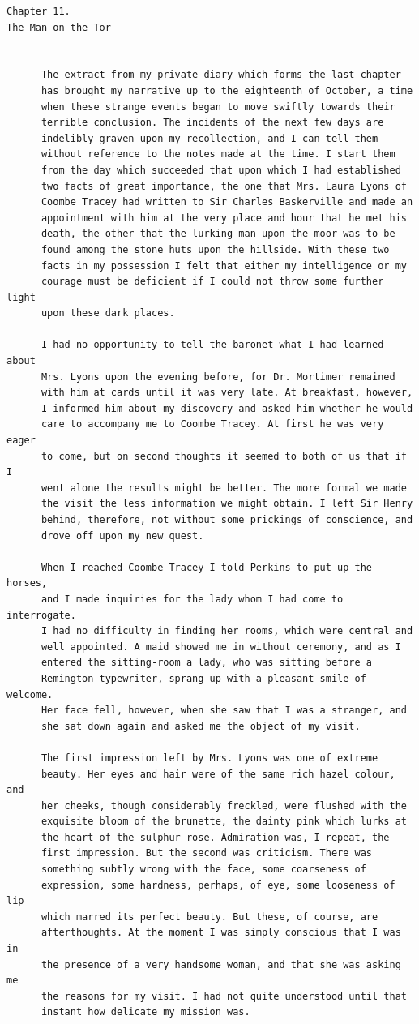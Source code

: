 \documentclass{article}
\begin{document}
\begin{verbatim}
Chapter 11.
The Man on the Tor


      The extract from my private diary which forms the last chapter
      has brought my narrative up to the eighteenth of October, a time
      when these strange events began to move swiftly towards their
      terrible conclusion. The incidents of the next few days are
      indelibly graven upon my recollection, and I can tell them
      without reference to the notes made at the time. I start them
      from the day which succeeded that upon which I had established
      two facts of great importance, the one that Mrs. Laura Lyons of
      Coombe Tracey had written to Sir Charles Baskerville and made an
      appointment with him at the very place and hour that he met his
      death, the other that the lurking man upon the moor was to be
      found among the stone huts upon the hillside. With these two
      facts in my possession I felt that either my intelligence or my
      courage must be deficient if I could not throw some further light
      upon these dark places.

      I had no opportunity to tell the baronet what I had learned about
      Mrs. Lyons upon the evening before, for Dr. Mortimer remained
      with him at cards until it was very late. At breakfast, however,
      I informed him about my discovery and asked him whether he would
      care to accompany me to Coombe Tracey. At first he was very eager
      to come, but on second thoughts it seemed to both of us that if I
      went alone the results might be better. The more formal we made
      the visit the less information we might obtain. I left Sir Henry
      behind, therefore, not without some prickings of conscience, and
      drove off upon my new quest.

      When I reached Coombe Tracey I told Perkins to put up the horses,
      and I made inquiries for the lady whom I had come to interrogate.
      I had no difficulty in finding her rooms, which were central and
      well appointed. A maid showed me in without ceremony, and as I
      entered the sitting-room a lady, who was sitting before a
      Remington typewriter, sprang up with a pleasant smile of welcome.
      Her face fell, however, when she saw that I was a stranger, and
      she sat down again and asked me the object of my visit.

      The first impression left by Mrs. Lyons was one of extreme
      beauty. Her eyes and hair were of the same rich hazel colour, and
      her cheeks, though considerably freckled, were flushed with the
      exquisite bloom of the brunette, the dainty pink which lurks at
      the heart of the sulphur rose. Admiration was, I repeat, the
      first impression. But the second was criticism. There was
      something subtly wrong with the face, some coarseness of
      expression, some hardness, perhaps, of eye, some looseness of lip
      which marred its perfect beauty. But these, of course, are
      afterthoughts. At the moment I was simply conscious that I was in
      the presence of a very handsome woman, and that she was asking me
      the reasons for my visit. I had not quite understood until that
      instant how delicate my mission was.


\end{verbatim}
\end{document}
